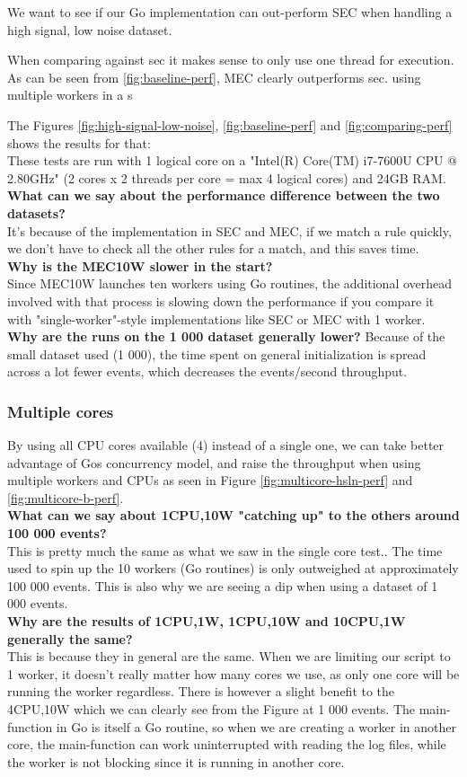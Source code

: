 We want to see if our Go implementation can out-perform SEC when handling a high signal, low noise dataset.

When comparing against \acrshort{sec} it makes sense to only use one thread for execution. As can be seen from \cref{fig:baseline-perf}, MEC clearly outperforms \acrshort{sec}. using multiple workers in a s

The Figures \cref{fig:high-signal-low-noise}, \cref{fig:baseline-perf} and \cref{fig:comparing-perf} shows the results for that:
\\
These tests are run with 1 logical core on a "Intel(R) Core(TM) i7-7600U CPU @ 2.80GHz" (2 cores x 2 threads per core = max 4 logical cores) and 24GB RAM.\\
\textbf{What can we say about the performance difference between the two datasets?}\\
It's because of the implementation in SEC and MEC, if we match a rule quickly, we don't have to check all the other rules for a match, and this saves time.\\
\textbf{Why is the MEC10W slower in the start?}\\
Since MEC10W launches ten workers using Go routines, the additional overhead involved with that process is slowing down the performance if you compare it with "single-worker"-style implementations like SEC or MEC with 1 worker.\\
\textbf{Why are the runs on the 1 000 dataset generally lower?}
Because of the small dataset used (1 000), the time spent on general initialization is spread across a lot fewer events, which decreases the events/second throughput.

\subsubsection{Multiple cores}

By using all CPU cores available (4) instead of a single one, we can take better advantage of Gos concurrency model, and raise the throughput when using multiple workers and CPUs as seen in Figure \cref{fig:multicore-hsln-perf} and \cref{fig:multicore-b-perf}.\\
\textbf{What can we say about 1CPU,10W "catching up" to the others around 100 000 events?}\\
This is pretty much the same as what we saw in the single core test.. The time used to spin up the 10 workers (Go routines) is only outweighed at approximately 100 000 events. This is also why we are seeing a dip when using a dataset of 1 000 events.\\
\textbf{Why are the results of 1CPU,1W, 1CPU,10W and 10CPU,1W generally the same?}\\
This is because they in general are the same. When we are limiting our script to 1 worker, it doesn't really matter how many cores we use, as only one core will be running the worker regardless. There is however a slight benefit to the 4CPU,10W which we can clearly see from the Figure at 1 000 events. The main-function in Go is itself a Go routine, so when we are creating a worker in another core, the main-function can work uninterrupted with reading the log files, while the worker is not blocking since it is running in another core.

